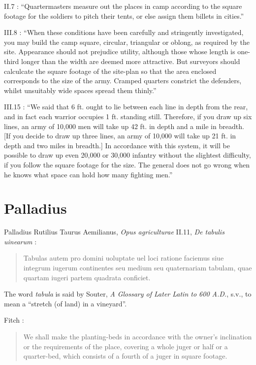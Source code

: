 \documentclass{article}
\theoremstyle{definition}
\begin{document}
II.7 \cite[pp.~38--39]{vegetius}: ``Quartermasters measure out the places in camp according to the square footage
for the soldiers to pitch their tents, or else assign them billets in cities.''

III.8 \cite[p.~80]{vegetius}: ``When these conditions have been carefully and stringently investigated, you may build
the camp square, circular, triangular or oblong, as required by the site. Appearance should not prejudice utility, although those
whose length is one-third longer than the width are deemed more attractive. But surveyors should calculcate
the square footage of the site-plan so that the area enclosed corresponds to the size of the army. Cramped quarters
constrict the defenders, whilst unsuitably wide spaces spread them thinly.''

III.15 \cite[p.~97]{vegetius}: ``We said that 6 ft. ought to lie between each line in depth from the rear, and in fact each
warrior occupies 1 ft. standing still. Therefore, if you draw up six lines, an army of 10,000 men will take up 42 ft.
in depth and a mile in breadth. [If you decide to draw up three lines, an army of 10,000 will take up 21 ft. in depth and two
miles in breadth.] In accordance with this system, it will be possible to draw up even 20,000 or 30,000 infantry without the slightest
difficulty, if you follow the square footage for the size. The general does not go wrong when he knows what space
can hold how many fighting men.'' 







\section{Palladius}
Palladius Rutilius Taurus Aemilianus, {\em Opus agriculturae} II.11, {\em De tabulis uinearum} \cite[p.~54]{palladii}:

\begin{quote}
Tabulas autem pro domini uoluptate uel loci ratione
faciemus siue integrum iugerum continentes seu medium
seu quaternariam tabulam, quae quartam iugeri partem
quadrata conficiet.
\end{quote}

The word {\em tabula} is said by Souter, {\em A Glossary of Later Latin to 600 A.D.}, s.v., to mean a ``stretch (of land) in a vineyard''.

Fitch \cite[p.~75]{fitch}:

\begin{quote}
We shall make the planting-beds in accordance with the owner's inclination or the requirements of the place, covering a whole juger or half or a quarter-bed, which consists of a fourth of a juger in square footage. 
\end{quote}
\end{document}
